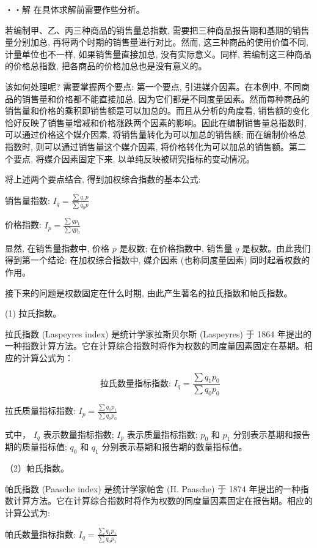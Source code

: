\documentclass[10pt]{article}
\begin{document}
\begin{CJK*}{UTF8}{bsmi}
・・解 在具体求解前需要作些分析。

若编制甲、乙、丙三种商品的销售量总指数, 需要把三种商品报告期和基期的销售量分别加总, 再将两个时期的销售量进行对比。然而, 这三种商品的使用价值不同, 计量单位也不一样, 如果销售量直接加总, 没有实际意义。同样, 若编制这三种商品的价格总指数, 把各商品的价格加总也是没有意义的。

该如何处理呢? 需要掌握两个要点: 第一个要点, 引进媒介因素。在本例中, 不同商品的销售量和价格都不能直接加总, 因为它们都是不同度量因素。然而每种商品的销售量和价格的乘积即销售额是可以加总的。而且从分析的角度看, 销售额的变化恰好反映了销售量增减和价格涨跌两个因素的影响。因此在编制销售量总指数时, 可以通过价格这个媒介因素, 将销售量转化为可以加总的销售额; 而在编制价格总指数时, 则可以通过销售量这个媒介因素, 将价格转化为可以加总的销售额。第二个要点, 将媒介因素固定下来, 以单纯反映被研究指标的变动情况。

将上述两个要点结合, 得到加权综合指数的基本公式:

销售量指数: $I_{q}=\frac{\sum q_{1} p}{\sum q_{0} p}$

价格指数: $I_{p}=\frac{\sum q p_{1}}{\sum q p_{0}}$

显然, 在销售量指数中, 价格 $p$ 是权数; 在价格指数中, 销售量 $q$ 是权数。由此我们得到第一个结论: 在加权综合指数中, 媒介因素 (也称同度量因素) 同时起着权数的作用。

接下来的问题是权数固定在什么时期, 由此产生著名的拉氏指数和帕氏指数。

(1) 拉氏指数。

拉氏指数 (Laspeyres index) 是统计学家拉斯贝尔斯 (Laspeyres) 于 1864 年提出的一种指数计算方法。它在计算综合指数时将作为权数的同度量因素固定在基期。相应的计算公式为：


\begin{equation*}
\text { 拉氏数量指标指数: } I_{q}=\frac{\sum q_{1} p_{0}}{\sum q_{0} p_{0}} \tag{14.7}
\end{equation*}


拉氏质量指标指数: $I_{p}=\frac{\sum q_{0} p_{1}}{\sum q_{0} p_{0}}$

式中， $I_{q}$ 表示数量指标指数; $I_{p}$ 表示质量指标指数; $p_{0}$ 和 $p_{1}$ 分别表示基期和报告期的质量指标值; $q_{0}$ 和 $q_{1}$ 分别表示基期和报告期的数量指标值。

（2）帕氏指数。

帕氏指数 (Paasche index) 是统计学家帕舍 (H. Paasche) 于 1874 年提出的一种指数计算方法。它在计算综合指数时将作为权数的同度量因素固定在报告期。相应的计算公式为:

帕氏数量指标指数: $I_{q}=\frac{\sum q_{1} p_{1}}{\sum q_{0} p_{1}}$


\end{CJK*}
\end{document}
